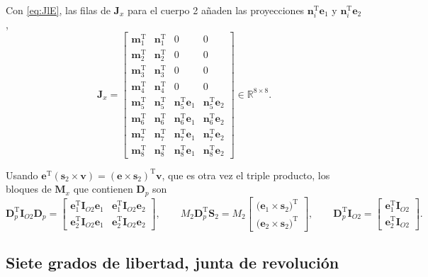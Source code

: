 \documentclass[11pt]{article}
\newcommand{\T}{^{\mathrm{T}}}
\newcommand{\IO}[1]{\mathbf{I}_{O#1}}
\begin{document}
Con \eqref{eq:JlE}, las filas de $\mathbf{J}_x$ para el cuerpo 2 añaden las proyecciones $\mathbf{n}_i\T\mathbf{e}_1$ y $\mathbf{n}_i\T\mathbf{e}_2$,
\begin{equation}
\mathbf{J}_x=
\begin{bmatrix}
\mathbf{m}_1\T & \mathbf{n}_1\T & 0 & 0\\
\mathbf{m}_2\T & \mathbf{n}_2\T & 0 & 0\\
\mathbf{m}_3\T & \mathbf{n}_3\T & 0 & 0\\
\mathbf{m}_4\T & \mathbf{n}_4\T & 0 & 0\\
\mathbf{m}_5\T & \mathbf{n}_5\T & \mathbf{n}_5\T\mathbf{e}_1 & \mathbf{n}_5\T\mathbf{e}_2\\
\mathbf{m}_6\T & \mathbf{n}_6\T & \mathbf{n}_6\T\mathbf{e}_1 & \mathbf{n}_6\T\mathbf{e}_2\\
\mathbf{m}_7\T & \mathbf{n}_7\T & \mathbf{n}_7\T\mathbf{e}_1 & \mathbf{n}_7\T\mathbf{e}_2\\
\mathbf{m}_8\T & \mathbf{n}_8\T & \mathbf{n}_8\T\mathbf{e}_1 & \mathbf{n}_8\T\mathbf{e}_2
\end{bmatrix}\in\mathbb{R}^{8\times8}.
\label{eq:Jx8}
\end{equation}

Usando $\mathbf{e}\T(\mathbf{s}_2\times\mathbf{v})=(\mathbf{e}\times\mathbf{s}_2)\T\mathbf{v}$, que es otra vez el triple producto, los bloques de $\mathbf{M}_x$ que contienen $\mathbf{D}_p$ son
\begin{equation}
\mathbf{D}_p\T\IO{2}\mathbf{D}_p=
\begin{bmatrix}
\mathbf{e}_1\T\IO{2}\mathbf{e}_1 & \mathbf{e}_1\T\IO{2}\mathbf{e}_2\\
\mathbf{e}_2\T\IO{2}\mathbf{e}_1 & \mathbf{e}_2\T\IO{2}\mathbf{e}_2
\end{bmatrix},
\qquad
M_2\mathbf{D}_p\T\mathbf{S}_2=M_2
\begin{bmatrix}
\big(\mathbf{e}_1\times\mathbf{s}_2\big)\T\\
\big(\mathbf{e}_2\times\mathbf{s}_2\big)\T
\end{bmatrix},
\qquad
\mathbf{D}_p\T\IO{2}=
\begin{bmatrix}
\mathbf{e}_1\T\IO{2}\\
\mathbf{e}_2\T\IO{2}
\end{bmatrix}.
\label{eq:Mx8}
\end{equation}

\subsection{Siete grados de libertad, junta de revolución}
\end{document}
